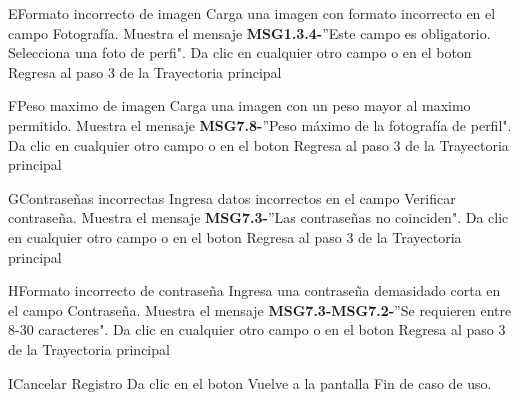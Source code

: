 \begin{UCtrayectoriaA}{E}{Formato incorrecto de imagen}
	\UCpaso[\UCactor] Carga una imagen con formato incorrecto en el campo Fotografía.
	\UCpaso Muestra el mensaje {\bf MSG1.3.4-}''Este campo es obligatorio. Selecciona una foto de perfi".
	\UCpaso[\UCactor] Da clic en cualquier otro campo o en el boton 
	\UCpaso Regresa al paso 3 de la Trayectoria principal
\end{UCtrayectoriaA}

\begin{UCtrayectoriaA}{F}{Peso maximo de imagen}
	\UCpaso[\UCactor] Carga una imagen con un peso mayor al maximo permitido.
	\UCpaso Muestra el mensaje {\bf MSG7.8-}''Peso máximo de la fotografía de perfil".
	\UCpaso[\UCactor] Da clic en cualquier otro campo o en el boton 
	\UCpaso Regresa al paso 3 de la Trayectoria principal
\end{UCtrayectoriaA}

\begin{UCtrayectoriaA}{G}{Contraseñas incorrectas}
	\UCpaso[\UCactor] Ingresa datos incorrectos en el campo Verificar contraseña.
	\UCpaso Muestra el mensaje {\bf MSG7.3-}''Las contraseñas no coinciden".
	\UCpaso[\UCactor] Da clic en cualquier otro campo o en el boton 
	\UCpaso Regresa al paso 3 de la Trayectoria principal
\end{UCtrayectoriaA}

\begin{UCtrayectoriaA}{H}{Formato incorrecto de contraseña}
	\UCpaso[\UCactor] Ingresa una contraseña demasidado corta en el campo Contraseña.
	\UCpaso Muestra el mensaje {\bf MSG7.3-}{\bf MSG7.2-}''Se requieren entre 8-30 caracteres".
	\UCpaso[\UCactor] Da clic en cualquier otro campo o en el boton 
	\UCpaso Regresa al paso 3 de la Trayectoria principal
\end{UCtrayectoriaA}

\begin{UCtrayectoriaA}{I}{Cancelar Registro}
	\UCpaso[\UCactor] Da clic en el boton 
	\UCpaso Vuelve a la pantalla 
	\UCpaso Fin de caso de uso.
\end{UCtrayectoriaA}
